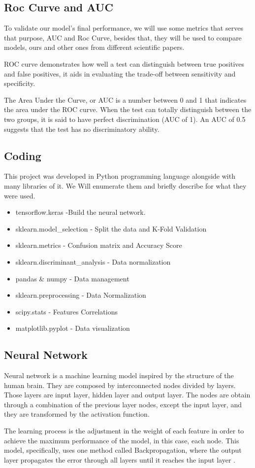 \documentclass[12pt,a4paper,twocolumn]{article}
\begin{document}
\subsection{Roc Curve and AUC}
\par To validate our model's final performance, we will use some metrics that serves that purpose, AUC and Roc Curve, besides that, they will be used to compare models, ours and other ones from different scientific papers.
\par ROC curve demonstrates how well a test can distinguish between true positives and false positives, it aids in evaluating the trade-off between sensitivity and specificity.
\par The Area Under the Curve, or AUC is a number between 0 and 1 that indicates the area under the ROC curve. When the test can totally distinguish between the two groups, it is said to have perfect discrimination (AUC of 1). An AUC of 0.5 suggests that the test has no discriminatory ability.
\subsection{Coding}
\par This project was developed in Python programming language alongside with many libraries of it. We Will enumerate them and briefly describe for what they were used.
\begin{itemize}
  \item tensorflow.keras -Build the neural network.
  \item sklearn.model\_selection \cite{sklearn} - Split the data and K-Fold Validation
  \item sklearn.metrics - Confusion matrix and Accuracy Score
  \item sklearn.discriminant\_analysis - Data normalization
  \item pandas \& numpy - Data management
  \item sklearn.preprocessing - Data Normalization
  \item scipy.stats - Features Correlations
  \item matplotlib.pyplot - Data visualization
\end{itemize}

\subsection{Neural Network}
\par Neural network is a machine learning model inspired by the structure of the human brain. They are composed by interconnected nodes divided by layers. Those layers are input layer, hidden layer and output layer.  The nodes are obtain through a combination of the previous layer nodes, except the input layer, and they are transformed by the activation function.\par The learning process is the adjustment in the weight of each feature in order to achieve the maximum performance of the model, in this case, each node. This model, specifically,  uses one  method called Backpropagation, where the output layer propagates the error through all layers until it reaches the input layer .
\end{document}
